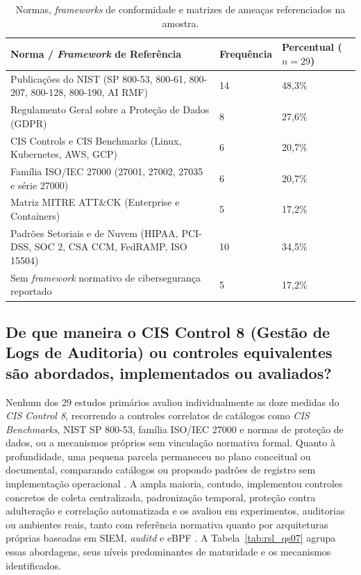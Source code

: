 \begin{table}[!htbp]
    \centering
    \caption{Normas, \textit{frameworks} de conformidade e matrizes de ameaças referenciados na amostra.}
    \label{tab:rsl_qs06}
    \footnotesize
    \begin{tabular}{p{9.6cm}p{2.0cm}p{2.4cm}}
        \hline
        \textbf{Norma / \textit{Framework} de Referência} & \textbf{Frequência} & \textbf{Percentual ($n=29$)} \\ \hline
        Publicações do NIST (SP 800-53, 800-61, 800-207, 800-128, 800-190, AI RMF) & 14 & 48,3\% \\ \hline
        Regulamento Geral sobre a Proteção de Dados (GDPR) & 8 & 27,6\% \\ \hline
        CIS Controls e CIS Benchmarks (Linux, Kubernetes, AWS, GCP) & 6 & 20,7\% \\ \hline
        Família ISO/IEC 27000 (27001, 27002, 27035 e série 27000) & 6 & 20,7\% \\ \hline
        Matriz MITRE ATT\&CK (Enterprise e Containers) & 5 & 17,2\% \\ \hline
        Padrões Setoriais e de Nuvem (HIPAA, PCI-DSS, SOC 2, CSA CCM, FedRAMP, ISO 15504) & 10 & 34,5\% \\ \hline
        Sem \textit{framework} normativo de cibersegurança reportado & 5 & 17,2\% \\ \hline
    \end{tabular}
\end{table}
\FloatBarrier

\subsection{De que maneira o CIS Control 8 (Gestão de Logs de Auditoria) ou controles equivalentes são abordados, implementados ou avaliados?}
\label{subsec:rsl_qs07}

Nenhum dos 29 estudos primários avaliou individualmente as doze medidas do \textit{CIS Control 8}, recorrendo a controles correlatos de catálogos como \textit{CIS Benchmarks}, NIST SP 800-53, família ISO/IEC 27000 e normas de proteção de dados, ou a mecanismos próprios sem vinculação normativa formal. Quanto à profundidade, uma pequena parcela permaneceu no plano conceitual ou documental, comparando catálogos ou propondo padrões de registro sem implementação operacional \cite{giulio2017,ali2024,albuquerque2024}. A ampla maioria, contudo, implementou controles concretos de coleta centralizada, padronização temporal, proteção contra adulteração e correlação automatizada e os avaliou em experimentos, auditorias ou ambientes reais, tanto com referência normativa \cite{torkura2021,shao2026a,bungei2026,coutinho2023,velasquez2025,aftab2026,enaw2018} quanto por arquiteturas próprias baseadas em SIEM, \textit{auditd} e eBPF \cite{sushma2025,setiawan2025,jin2025,joshisegireddy2026,acosta2025}. A Tabela~\ref{tab:rsl_qs07} agrupa essas abordagens, seus níveis predominantes de maturidade e os mecanismos identificados.

